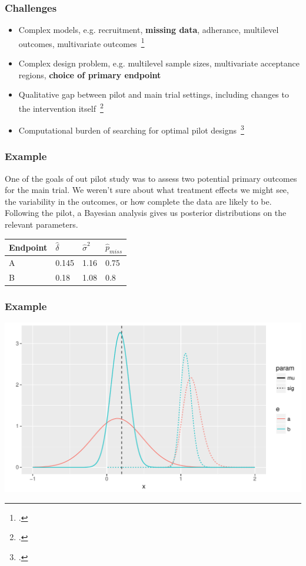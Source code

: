 \documentclass{beamer}
\begin{document}
\begin{frame}
\frametitle{Challenges}
\begin{itemize}
\item Complex models, e.g. recruitment, \textbf{missing data}, adherance, multilevel outcomes, multivariate outcomes~\footcite{Landau2013}
\item Complex design problem, e.g. multilevel sample sizes, multivariate acceptance regions, \textbf{choice of primary endpoint}
\item Qualitative gap between pilot and main trial settings, including changes to the intervention itself~\footcite{Hampson2017}
\item Computational burden of searching for optimal pilot designs~\footcite{Strong2015}
\end{itemize}
\end{frame}

\begin{frame}
\frametitle{Example}
\begin{example}
One of the goals of out pilot study was to assess two potential primary outcomes for the main trial. We weren't sure about what treatment effects we might see, the variability in the outcomes, or how complete the data are likely to be. Following the pilot, a Bayesian analysis gives us posterior distributions on the relevant parameters.
\end{example}
\vspace{5mm}
\centering
\begin{tabular}{l l l l}
\toprule
Endpoint	& $\hat{\delta}$	& $\hat{\sigma}^{2}$	& $\hat{p}_{miss}$ \\
\midrule
A			& 0.145				& 1.16					& 0.75 \\
B			& 0.18				& 1.08					& 0.8 \\
\bottomrule
\end{tabular}
\end{frame}

\begin{frame}
\frametitle{Example}
\centering
\includegraphics[scale=0.6]{endpoints1}
\end{frame}
\end{document}
